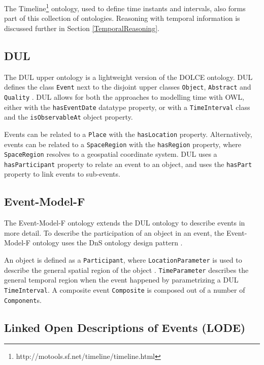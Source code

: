 The Timeline\footnote{http://motools.sf.net/timeline/timeline.html} ontology, used to define time instants and intervals, also forms part of this collection of ontologies. Reasoning with temporal information is discussed further in Section \ref{TemporalReasoning}.  

\subsection{DUL}

The \ac{DUL} upper ontology is a lightweight version of the \ac{DOLCE} ontology. \ac{DUL} defines the class \texttt{Event} next to the disjoint upper classes \texttt{Object}, \texttt{Abstract} and \texttt{Quality} \cite{Scherp2011}. \ac{DUL} allows for both the approaches to modelling time with \ac{OWL}, either with the \texttt{hasEventDate} datatype property, or with a \texttt{TimeInterval} class and the \texttt{isObservableAt} object property.

Events can be related to a \texttt{Place} with the \texttt{hasLocation} property. Alternatively, events can be related to a \texttt{SpaceRegion} with the \texttt{hasRegion} property, where \texttt{Space\-Region} resolves to a geospatial coordinate system. \ac{DUL} uses a \texttt{hasParticipant} property to relate an event to an object, and uses the \texttt{hasPart} property to link events to sub-events.

\subsection{Event-Model-F}

The Event-Model-F ontology extends the \ac{DUL} ontology to describe events in more detail. To describe the participation of an object in an event, the Event-Model-F ontology uses the \ac{DnS} ontology design pattern \cite{Shaw2009}. 

An object is defined as a \texttt{Participant}, where \texttt{LocationParameter} is used to describe the general spatial region of the object \cite{Scherp2011}. \texttt{Time\-Parameter} describes the general temporal region when the event happened by parametrizing a \ac{DUL} \texttt{TimeInterval}. A composite event \texttt{Composite} is composed out of a number of \texttt{Component}s.

\subsection{Linked Open Descriptions of Events (LODE)}

